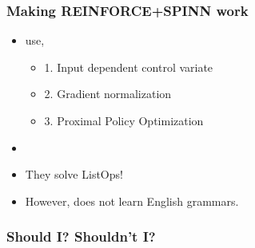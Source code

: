 \begin{frame}
\frametitle{Making REINFORCE+SPINN work}
\begin{itemize}
\item[] \cite{havrylov-2019-cooperative} use,
	\begin{itemize}
		\item[] 1. Input dependent control variate
		\item[] 2. Gradient normalization
		\item[] 3. Proximal Policy Optimization
	\end{itemize}
\item<2->[]
\item<2->[] They solve ListOps!
\item<3->[] However, does not learn English grammars.
\end{itemize}
\end{frame}



\begin{frame}%
\frametitle{Should I? Shouldn't I?}%
\end{frame}
